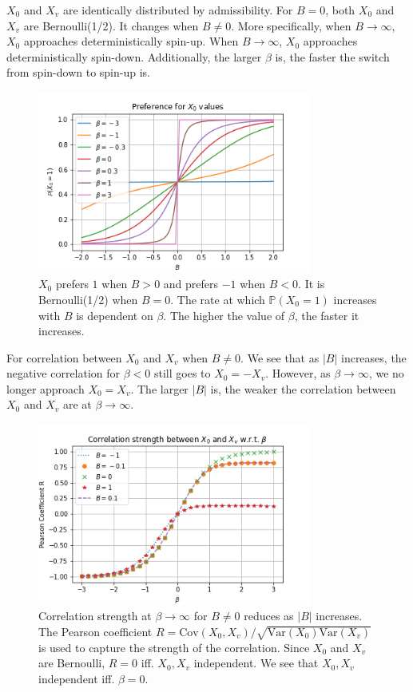 \documentclass[12pt]{article}
\begin{document}
$X_0$ and $X_v$ are identically distributed by admissibility. For $B=0$, both $X_0$ and $X_v$ are Bernoulli(1/2). It changes when $B\neq 0$. More
specifically, when $B\rightarrow\infty$, $X_0$ approaches deterministically spin-up. When $B\rightarrow\infty$, $X_0$ approaches deterministically spin-down.
Additionally, the larger $\beta$ is, the faster the switch from spin-down to spin-up is.

\newpage

\begin{figure}[h]
    \centering
    \includegraphics[width=9cm]{img/ising_x0_B.png}
    \caption{$X_0$ prefers $1$ when $B > 0$ and prefers $-1$ when $B < 0$. It is Bernoulli(1/2) when $B=0$. The rate at which $\mathbb{P}(X_0=1)$ increases with $B$ is dependent on $\beta$. The higher the value of $\beta$, the faster it increases.}
    \label{Fig.ising-x0-B}
\end{figure}

For correlation between $X_0$ and $X_v$ when $B\neq 0$. We see that as $|B|$
increases, the negative correlation for $\beta<0$ still goes to $X_0=-X_v$.
However, as $\beta\rightarrow\infty$, we no longer approach $X_0=X_v$. The larger
$|B|$ is, the weaker the correlation between $X_0$ and $X_v$ are at
$\beta\rightarrow\infty$.

\begin{figure}[h]
    \centering
    \includegraphics[width=9cm]{img/ising_x0_xv_pearson.png}
    \caption{Correlation strength at $\beta\rightarrow\infty$ for $B\neq 0$ reduces
        as $|B|$ increases. The Pearson coefficient $R=\text{Cov}(X_0, X_v)/\sqrt{\text{Var}(X_0)\text{Var}(X_v)}$ is used to capture the strength of the correlation. Since $X_0$ and $X_v$ are Bernoulli, $R=0$ iff. $X_0, X_v$ independent. We see that $X_0, X_v$ independent iff. $\beta=0$.}
    \label{Fig. ising_x0_xv_B}
\end{figure}
\end{document}
